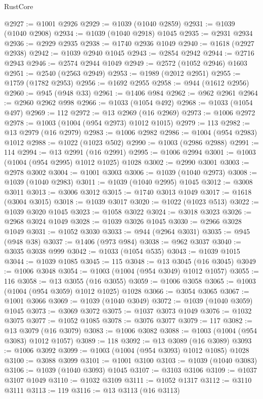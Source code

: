 \begin{lexlean}{RustCore}
\begin{coremodule}
@2927 := @1001 @2926
@2929 := @1039 (@1040 @2859)
@2931 := @1039 (@1040 @2908)
@2934 := @1039 (@1040 @2918) @1045
@2935 := @2931 @2934
@2936 := @2929 @2935
@2938 := @1740 @2936 @1049
@2940 := @1618 (@2927 @2938)
@2942 := @1039 @2940 @1045
@2943 := @2854 @2942
@2944 := @2716 @2943
@2946 := @2574 @2944 @1049
@2949 := @2572 (@1052 @2946) @1603
@2951 := @2540 (@2563 @2949)
@2953 := @1989 (@2012 @2951)
@2955 := @1759 (@1782 @2953)
@2956 := @1692 @2955
@2958 := @944 (@1612 @2956)
@2960 := @945 (@948 @33)
@2961 := @1406 @984
@2962 := @962 @2961
@2964 := @2960 @2962 @998
@2966 := @1033 (@1054 @492)
@2968 := @1033 (@1054 @497)
@2969 := 112
@2972 := @13 @2969 (@16 @2969)
@2973 := @1006 @2972
@2978 := @1003 (@1004 (@954 @2973) @1012 @1015)
@2979 := 113
@2982 := @13 @2979 (@16 @2979)
@2983 := @1006 @2982
@2986 := @1004 (@954 @2983) @1012
@2988 := @1022 (@1023 @502)
@2990 := @1003 (@2986 @2988)
@2991 := 114
@2994 := @13 @2991 (@16 @2991)
@2995 := @1006 @2994
@3001 := @1003 (@1004 (@954 @2995) @1012 @1025) @1028
@3002 := @2990 @3001
@3003 := @2978 @3002
@3004 := @1001 @3003
@3006 := @1039 (@1040 @2973)
@3008 := @1039 (@1040 @2983)
@3011 := @1039 (@1040 @2995) @1045
@3012 := @3008 @3011
@3013 := @3006 @3012
@3015 := @1740 @3013 @1049
@3017 := @1618 (@3004 @3015)
@3018 := @1039 @3017
@3020 := @1022 (@1023 @513)
@3022 := @1039 @3020 @1045
@3023 := @1058 @3022
@3024 := @3018 @3023
@3026 := @2968 @3024 @1049
@3028 := @1039 @3026 @1045
@3030 := @2966 @3028 @1049
@3031 := @1052 @3030
@3033 := @944 (@2964 @3031)
@3035 := @945 (@948 @38)
@3037 := @1406 (@973 @984)
@3038 := @962 @3037
@3040 := @3035 @3038 @999
@3042 := @1033 (@1054 @535)
@3043 := @1039 @1015
@3044 := @1039 @1085
@3045 := 115
@3048 := @13 @3045 (@16 @3045)
@3049 := @1006 @3048
@3054 := @1003 (@1004 (@954 @3049) @1012 @1057)
@3055 := 116
@3058 := @13 @3055 (@16 @3055)
@3059 := @1006 @3058
@3065 := @1003 (@1004 (@954 @3059) @1012 @1025) @1028
@3066 := @3054 @3065
@3067 := @1001 @3066
@3069 := @1039 (@1040 @3049)
@3072 := @1039 (@1040 @3059) @1045
@3073 := @3069 @3072
@3075 := @1037 @3073 @1049
@3076 := @1032 @3075
@3077 := @1052 @1085
@3078 := @3076 @3077
@3079 := 117
@3082 := @13 @3079 (@16 @3079)
@3083 := @1006 @3082
@3088 := @1003 (@1004 (@954 @3083) @1012 @1057)
@3089 := 118
@3092 := @13 @3089 (@16 @3089)
@3093 := @1006 @3092
@3099 := @1003 (@1004 (@954 @3093) @1012 @1085) @1028
@3100 := @3088 @3099
@3101 := @1001 @3100
@3103 := @1039 (@1040 @3083)
@3106 := @1039 (@1040 @3093) @1045
@3107 := @3103 @3106
@3109 := @1037 @3107 @1049
@3110 := @1032 @3109
@3111 := @1052 @1317
@3112 := @3110 @3111
@3113 := 119
@3116 := @13 @3113 (@16 @3113)

\end{coremodule}
\end{lexlean}
